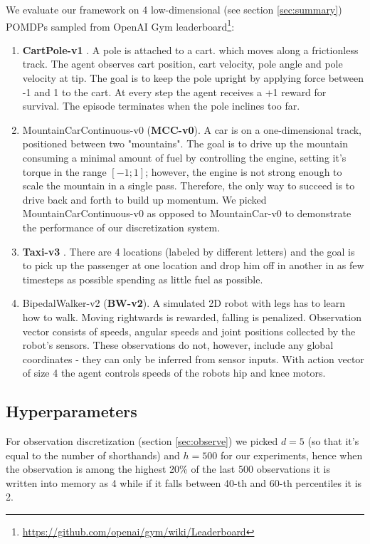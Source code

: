 We evaluate our framework on 4 low-dimensional (see section \ref{sec:summary}) POMDPs sampled from OpenAI Gym \cite{openai-gym} leaderboard\footnote{\url{https://github.com/openai/gym/wiki/Leaderboard}}:

\begin{enumerate}
\item \textbf{CartPole-v1} \cite{cartpole}.
A pole is attached to a cart.  which moves along a frictionless track.
The agent observes cart position, cart velocity, pole angle and pole velocity at tip.
The goal is to keep the pole upright by applying force between -1 and 1 to the cart.
At every step the agent receives a +1 reward for survival.
The episode terminates when the pole inclines too far.
\item MountainCarContinuous-v0 (\textbf{MCC-v0})\cite{mountain_car}.
A car is on a one-dimensional track, positioned between two "mountains". 
The goal is to drive up the mountain consuming a minimal amount of fuel by controlling the engine, setting it's torque in the range $[-1;1]$; however, the engine is not strong enough to scale the mountain in a single pass.
Therefore, the only way to succeed is to drive back and forth to build up momentum. 
We picked MountainCarContinuous-v0 as opposed to MountainCar-v0 to demonstrate the performance of our discretization system.
\item \textbf{Taxi-v3} \cite{taxi}. There are 4 locations (labeled by different letters) and the goal is to pick up the passenger at one location and drop him off in another in as few timesteps as possible spending as little fuel as possible.
\item BipedalWalker-v2 (\textbf{BW-v2}). A simulated 2D robot with legs has to learn how to walk. 
Moving rightwards is rewarded, falling is penalized.
Observation vector consists of speeds, angular speeds and joint positions collected by the robot's sensors.
These observations do not, however, include any global coordinates - they can only be inferred from sensor inputs.
With action vector of size 4 the agent controls speeds of the robots hip and knee motors.
\end{enumerate}

\subsection{Hyperparameters}

For observation discretization (section \ref{sec:observe}) we picked $d=5$ (so that it's equal to the number of shorthands) and $h=500$ for our experiments, hence when the observation is among the highest 20\% of the last 500 observations it is written into memory as 4 while if it falls between 40-th and 60-th percentiles it is 2.

